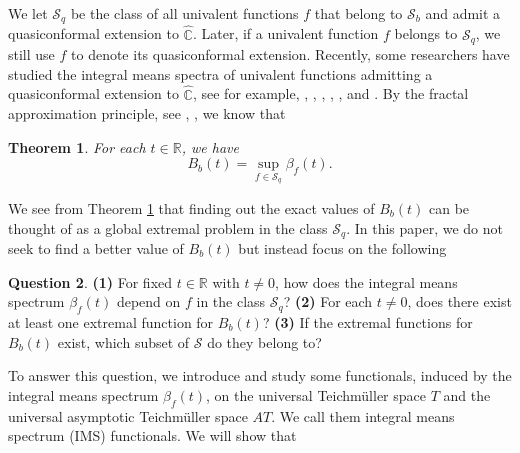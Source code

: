 \documentclass[11pt]{amsart}
\newtheorem{theorem}{Theorem}[section]
\theoremstyle{remark}
\theoremstyle{claim}
\theoremstyle{definition}
\theoremstyle{problem}
\theoremstyle{conjecture}
\theoremstyle{question}
\newtheorem{question}[theorem]{Question}
\numberwithin{equation}{section}
\begin{document}
We let $\mathcal{S}_q$ be the class of all univalent functions $f$ that belong to $\mathcal{S}_b$ and admit a quasiconformal extension to $\widehat{\mathbb{C}}$. Later, if a univalent function $f$ belongs to $\mathcal{S}_q$,  we still use $f$ to denote its quasiconformal extension. Recently, some researchers have studied the integral means spectra of univalent functions admitting a quasiconformal extension to $\widehat{\mathbb{C}}$, see for example, \cite{HS-2}, \cite{Hed-1}, \cite{Hed-2}, \cite{Iv}, \cite{Jin}, \cite{PS} and \cite{Pr}. By the fractal approximation principle, see \cite{M}, \cite{CJ},  we know that
\begin{theorem}\label{quan}
For each $t\in \mathbb{R}$, we have
\begin{equation}\label{qua}
B_b(t)=\sup\limits_{f\in \mathcal{S}_q}\beta_f(t).
\end{equation}
\end{theorem}

We see from Theorem \ref{quan} that finding out the exact values of $B_b(t)$ can be thought of as a global extremal problem in the class $\mathcal{S}_q$. In this paper, we do not seek to find a better value of $B_b(t)$ but instead focus on the following  
\begin{question}\label{ques}
{\bf (1)} For fixed $t \in \mathbb{R}$ with $t\neq 0$, how does the integral means spectrum $\beta_f(t)$ depend on $f$ in the class $\mathcal{S}_q$? {\bf (2)} For each $t\neq 0$, does there exist at least one extremal function for $B_b(t)$? {\bf (3)} If the extremal functions for $B_b(t)$ exist, which subset of $\mathcal{S}$ do they belong to?  \end{question}
To answer this question, we introduce and study some functionals, induced by the integral means spectrum $\beta_f(t)$,  on the universal Teichm\"uller space $T$ and the universal asymptotic Teichm\"uller space $AT$. We call them integral means spectrum (IMS) functionals.  We will show that
\end{document}
